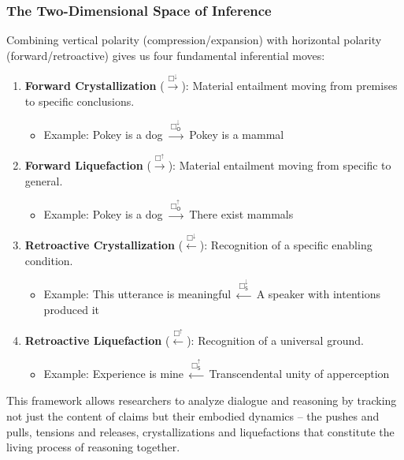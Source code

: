\documentclass[12pt]{book}
\newcommand{\SBoxUp}{\Box_{\mathsf{S}}^{\uparrow}}
\newcommand{\SBoxDown}{\Box_{\mathsf{S}}^{\downarrow}}
\newcommand{\OBoxUp}{\Box_{\mathsf{O}}^{\uparrow}}
\newcommand{\OBoxDown}{\Box_{\mathsf{O}}^{\downarrow}}
\begin{document}
\subsubsection{The Two-Dimensional Space of Inference}

Combining vertical polarity (compression/expansion) with horizontal polarity (forward/retroactive) gives us four fundamental inferential moves:

\begin{enumerate}
\item \textbf{Forward Crystallization} ($\xrightarrow{\Box^{\downarrow}}$): Material entailment moving from premises to specific conclusions.
\begin{itemize}
\item Example: Pokey is a dog $\xrightarrow{\,\OBoxDown\,}$ Pokey is a mammal
\end{itemize}

\item \textbf{Forward Liquefaction} ($\xrightarrow{\Box^{\uparrow}}$): Material entailment moving from specific to general.
\begin{itemize}
\item Example: Pokey is a dog $\xrightarrow{\,\OBoxUp\,}$ There exist mammals
\end{itemize}

\item \textbf{Retroactive Crystallization} ($\xleftarrow{\Box^{\downarrow}}$): Recognition of a specific enabling condition.
\begin{itemize}
\item Example: This utterance is meaningful $\xleftarrow{\,\SBoxDown\,}$ A speaker with intentions produced it
\end{itemize}

\item \textbf{Retroactive Liquefaction} ($\xleftarrow{\Box^{\uparrow}}$): Recognition of a universal ground.
\begin{itemize}
\item Example: Experience is mine $\xleftarrow{\,\SBoxUp\,}$ Transcendental unity of apperception
\end{itemize}
\end{enumerate}

This framework allows researchers to analyze dialogue and reasoning by tracking not just the content of claims but their embodied dynamics -- the pushes and pulls, tensions and releases, crystallizations and liquefactions that constitute the living process of reasoning together.
\end{document}
